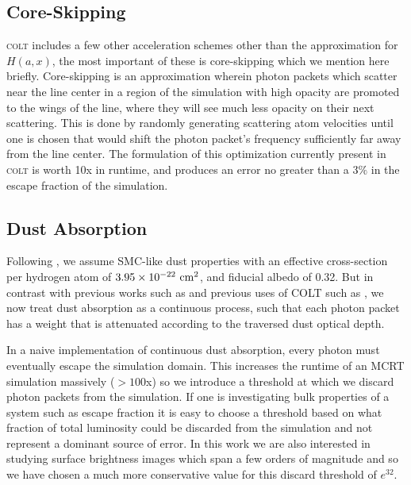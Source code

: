\subsection{Core-Skipping}
\textsc{colt} includes a few other acceleration schemes other than the approximation for $H(a, x)$, the most important of these is core-skipping which we mention here briefly.
Core-skipping is an approximation wherein photon packets which scatter near the line center in a region of the simulation with high opacity are promoted to the wings of the line, where they will see much less opacity on their next scattering.
This is done by randomly generating scattering atom velocities until one is chosen that would shift the photon packet's frequency sufficiently far away from the line center.
The formulation of this optimization currently present in \textsc{colt} is worth 10x in runtime, and produces an error no greater than a $3\%$ in the escape fraction of the simulation.

\subsection{Dust Absorption}
Following \citet{Laursen2009}, we assume SMC-like dust properties with an effective cross-section per hydrogen atom of $3.95\times10^{-22}\ \rm{cm}^{2}$, and fiducial albedo of 0.32.
But in contrast with previous works such as \citet{Laursen2007} and previous uses of \textsc{COLT} such as \citet{Smith2015}, we now treat dust absorption as a continuous process, such that each photon packet has a weight that is attenuated according to the traversed dust optical depth.

In a naive implementation of continuous dust absorption, every photon must eventually escape the simulation domain.
This increases the runtime of an MCRT simulation massively ($>100$x) so we introduce a threshold at which we discard photon packets from the simulation.
If one is investigating bulk properties of a system such as escape fraction it is easy to choose a threshold based on what fraction of total luminosity could be discarded from the simulation and not represent a dominant source of error.
In this work we are also interested in studying surface brightness images which span a few orders of magnitude and so we have chosen a much more conservative value for this discard threshold of $e^{32}$.

